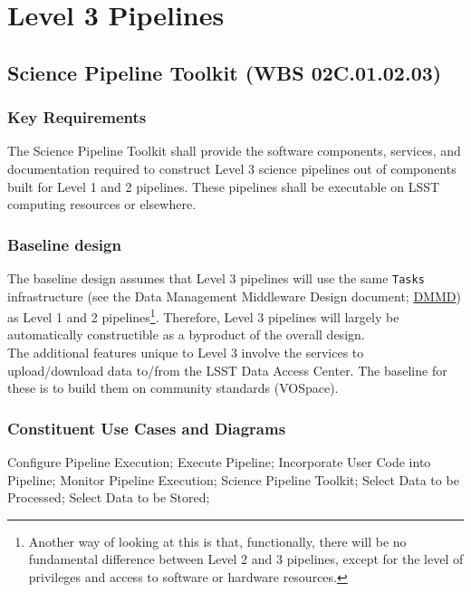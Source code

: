 \documentclass[12pt]{article}
\newcommand{\ds}[2]{{\color{blue} \href{https://docushare.lsstcorp.org/docushare/dsweb/Get/#1}{#2}}\xspace}
\newcommand{\DMMD}{\ds{LDM-152}{DMMD}}
\newcommand{\wbsSPT}{WBS 02C.01.02.03}
\begin{document}
\clearpage

\section{Level 3 Pipelines}

\subsection{Science Pipeline Toolkit (\wbsSPT)}

\subsubsection{Key Requirements}

The Science Pipeline Toolkit shall provide the software components, services, and documentation required to construct Level 3 science pipelines out of components built for Level 1 and 2 pipelines. These pipelines shall be executable on LSST computing resources or elsewhere.

\subsubsection{Baseline design}

The baseline design assumes that Level 3 pipelines will use the same {\tt Tasks} infrastructure (see the Data Management Middleware Design document; \DMMD) as Level 1 and 2 pipelines\footnote{Another way of looking at this is that, functionally, there will be no fundamental difference between Level 2 and 3 pipelines, except for the level of privileges and access to software or hardware resources.}. Therefore, Level 3 pipelines will largely be automatically constructible as a byproduct of the overall design.
\\

The additional features unique to Level 3 involve the services to upload/download data to/from the LSST Data Access Center. The baseline for these is to build them on community standards (VOSpace).

\subsubsection{Constituent Use Cases and Diagrams}

Configure Pipeline Execution; Execute Pipeline; Incorporate User Code into Pipeline; Monitor Pipeline Execution; Science Pipeline Toolkit; Select Data to be Processed; Select Data to be Stored;
\end{document}
